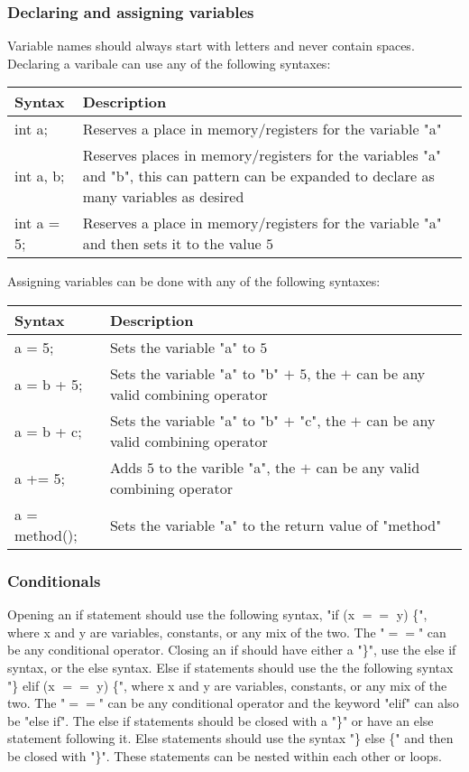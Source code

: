 		\subsubsection{Declaring and assigning variables}
			Variable names should always start with letters and never contain spaces.  Declaring a varibale can use any of the following syntaxes:\\
			\begin{center} \begin{tabular}{| l | p{10cm} |} \hline
				Syntax     & Description \\ \hline
				int a;     & Reserves a place in memory/registers for the variable "a"\\ \hline
				int a, b;  & Reserves places in memory/registers for the variables "a" and "b", this can pattern can be expanded to declare as many variables as desired\\ \hline
				int a = 5; & Reserves a place in memory/registers for the variable "a" and then sets it to the value $5$\\ \hline
			\end{tabular} \end{center}
			Assigning variables can be done with any of the following syntaxes:\\
			\begin{center} \begin{tabular}{| l | p{10cm} |} \hline
				Syntax        & Description \\ \hline
				a = 5;        & Sets the variable "a" to $5$\\ \hline
				a = b + 5;    & Sets the variable "a" to "b" $+$ $5$, the $+$ can be any valid combining operator\\ \hline
				a = b + c;    & Sets the variable "a" to "b" $+$ "c", the $+$ can be any valid combining operator\\ \hline
				a += 5;       & Adds $5$ to the varible "a", the $+$ can be any valid combining operator\\ \hline
				a = method(); & Sets the variable "a" to the return value of "method"\\ \hline
			\end{tabular} \end{center}
		\subsubsection{Conditionals}
			Opening an if statement should use the following syntax, "if (x $==$ y) \{", where x and y are variables, constants, or any mix of the two. The "$==$" can be any conditional operator. Closing an if should have either a "\}", use the else if syntax, or the else syntax.  Else if statements should use the the following syntax "\} elif (x $==$ y) \{", where x and y are variables, constants, or any mix of the two.  The "$==$" can be any conditional operator and the keyword "elif" can also be "else if".  The else if statements should be closed with a "\}" or have an else statement following it.  Else statements should use the syntax "\} else \{" and then be closed with "\}".  These statements can be nested within each other or loops.
